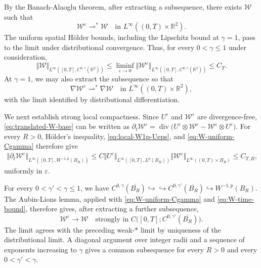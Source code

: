 \documentclass[reqno,11pt,a4paper]{amsart}
\begin{document}
By the Banach-Alaoglu theorem,
after extracting a subsequence,
there exists $\mathcal W$ such that
\[
  \mathcal W^\varepsilon\rightharpoonup^\ast\mathcal W
  \quad\text{in }
  L^\infty((0,T)\times\mathbb R^2).
\]
The uniform spatial H\"older bounds,
including the Lipschitz bound at $\gamma=1$,
pass to the limit under distributional convergence.
Thus, for every $0<\gamma\leq1$ under consideration,
\[
  \Vert \mathcal W\Vert _
    {L^\infty([0,T],C^{0,\gamma}(\mathbb R^2))}
  \leq
  \liminf_{\varepsilon\to0}
  \Vert \mathcal W^\varepsilon\Vert _
    {L^\infty([0,T],C^{0,\gamma}(\mathbb R^2))}
  \leq C_T.
\]
At $\gamma=1$, we may also extract the subsequence so that
\[
  \nabla\mathcal W^\varepsilon
  \rightharpoonup^\ast\nabla\mathcal W
  \quad\text{in }
  L^\infty((0,T)\times\mathbb R^2),
\]
with the limit identified by distributional differentiation.


We next establish strong local compactness.
Since $U^\varepsilon$ and $\mathcal W^\varepsilon$
are divergence-free,
\eqref{eq:translated-W-base} can be written as $\partial_t\mathcal W^\varepsilon
  =
  \operatorname{div}\bigl(
    U^\varepsilon\otimes\mathcal W^\varepsilon
    -\mathcal W^\varepsilon\otimes U^\varepsilon
  \bigr)$. 
For every $R>0$, H\"older's inequality,
\eqref{eq:local-W1p-Ueps}, and \eqref{eq:W-uniform-Cgamma}
therefore give
\begin{equation}\label{eq:W-time-bound}
\begin{aligned}
  \Vert \partial_t\mathcal W^\varepsilon
    \Vert _{L^\infty([0,T],W^{-1,p}(B_R))}
  \leq
  C\Vert U^\varepsilon\Vert _{L^\infty([0,T],L^p(B_R))}
  \Vert \mathcal W^\varepsilon
    \Vert _{L^\infty((0,T)\times B_R)}
  \leq C_{T,R},
\end{aligned}
\end{equation}
uniformly in $\varepsilon$.

For every $0<\gamma'<\gamma\leq1$, we have
$C^{0,\gamma}(\overline{B_R})
  \hookrightarrow\hookrightarrow
  C^{0,\gamma'}(\overline{B_R})
  \hookrightarrow W^{-1,p}(B_R)$.
The Aubin-Lions lemma,
applied with \eqref{eq:W-uniform-Cgamma}
and \eqref{eq:W-time-bound}, therefore gives,
after extracting a further subsequence,
\begin{equation}\label{eq:W-strong-local}
  \mathcal W^\varepsilon\longrightarrow\mathcal W
  \quad\text{strongly in }
  C\bigl([0,T];C^{0,\gamma'}(\overline{B_R})\bigr).
\end{equation}
The limit agrees with the preceding weak-$*$ limit
by uniqueness of the distributional limit.
A diagonal argument over integer radii
and a sequence of exponents increasing to $\gamma$
gives a common subsequence for every $R>0$
and every $0<\gamma'<\gamma$.
\end{document}
